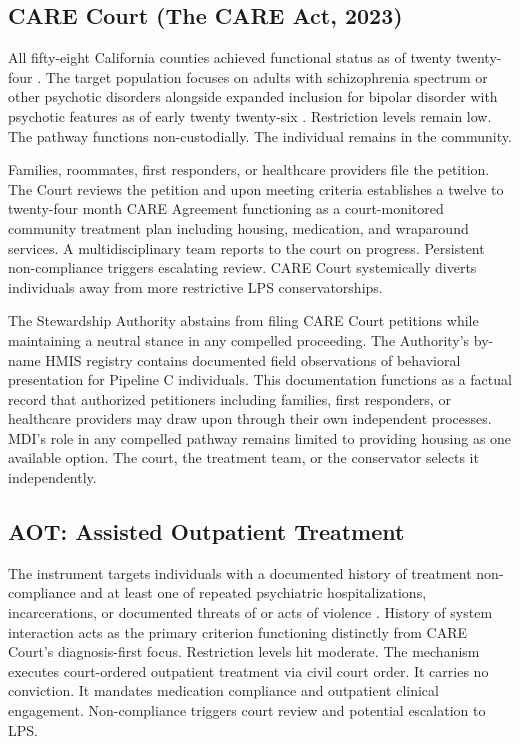 \documentclass[12pt, letterpaper]{article}
\begin{document}
\subsection{CARE Court (The CARE Act, 2023)}

All fifty-eight California counties achieved functional status as of twenty twenty-four \citep{care_act_2022}. The target population focuses on adults with schizophrenia spectrum or other psychotic disorders alongside expanded inclusion for bipolar disorder with psychotic features as of early twenty twenty-six \citep{care_act_sb14_2024}. Restriction levels remain low. The pathway functions non-custodially. The individual remains in the community.

Families, roommates, first responders, or healthcare providers file the petition. The Court reviews the petition and upon meeting criteria establishes a twelve to twenty-four month CARE Agreement functioning as a court-monitored community treatment plan including housing, medication, and wraparound services. A multidisciplinary team reports to the court on progress. Persistent non-compliance triggers escalating review. CARE Court systemically diverts individuals away from more restrictive LPS conservatorships.

The Stewardship Authority abstains from filing CARE Court petitions while maintaining a neutral stance in any compelled proceeding. The Authority's by-name HMIS registry contains documented field observations of behavioral presentation for Pipeline C individuals. This documentation functions as a factual record that authorized petitioners including families, first responders, or healthcare providers may draw upon through their own independent processes. MDI's role in any compelled pathway remains limited to providing housing as one available option. The court, the treatment team, or the conservator selects it independently.

\clearpage

\subsection{AOT: Assisted Outpatient Treatment}

The instrument targets individuals with a documented history of treatment non-compliance and at least one of repeated psychiatric hospitalizations, incarcerations, or documented threats of or acts of violence \citep{lauras_law_2002}. History of system interaction acts as the primary criterion functioning distinctly from CARE Court's diagnosis-first focus. Restriction levels hit moderate. The mechanism executes court-ordered outpatient treatment via civil court order. It carries no conviction. It mandates medication compliance and outpatient clinical engagement. Non-compliance triggers court review and potential escalation to LPS.
\end{document}
